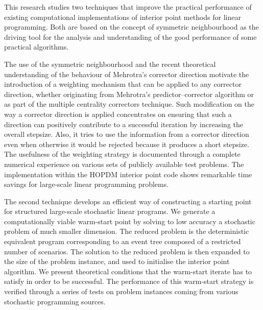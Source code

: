 
%
%

This research studies two techniques that improve
the practical performance of existing computational implementations 
of interior point methods for linear programming.
Both are based on the concept of symmetric neighbourhood 
as the driving tool for the analysis and understanding of the good 
performance of some practical algorithms. 

The use of the symmetric neighbourhood and the recent
theoretical understanding of the behaviour of Mehrotra's
corrector direction motivate the introduction of a weighting
mechanism that can be applied to any corrector direction,
whether originating from Mehrotra's predictor--corrector algorithm
or as part of the multiple centrality correctors technique.
Such modification on the way a corrector direction is applied
concentrates on ensuring that such a direction can positively
contribute to a successful iteration by increasing the overall
stepsize. Also, it tries to use the information from a corrector
direction even when otherwise it would be rejected because it
produces a short stepsize. 
The usefulness of the weighting strategy is documented through
a complete numerical experience on various sets of publicly
available test problems.
The implementation within the HOPDM interior point code
shows remarkable time savings for large-scale linear programming problems.

The second technique develops an efficient way of 
constructing a starting point for structured large-scale 
stochastic linear programs.
We generate a computationally viable warm-start point by solving 
to low accuracy a stochastic problem of much smaller dimension.
The reduced problem is the deterministic equivalent program
corresponding to an event tree composed of a restricted number
of scenarios.
The solution to the reduced problem is then expanded to the
size of the problem instance, and used to initialise the
interior point algorithm.
We present theoretical conditions that the warm-start iterate
has to satisfy in order to be successful.
The performance of this warm-start strategy is verified through 
a series of tests on problem instances coming from various stochastic
programming sources.
